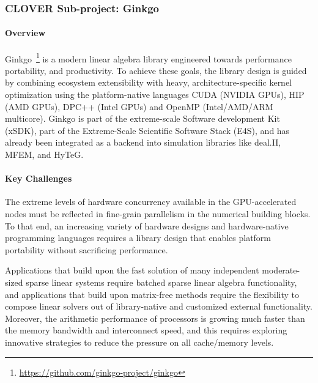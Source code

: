 \subsubsection{ CLOVER Sub-project: Ginkgo} \label{subsubsect:peeks}
\paragraph{Overview} 
Ginkgo~\footnote{\url{https://github.com/ginkgo-project/ginkgo}} is a modern
linear algebra library engineered towards performance portability, and
productivity. To achieve these goals, the library design is guided by combining
ecosystem extensibility with heavy, architecture-specific kernel optimization
using the platform-native languages CUDA (NVIDIA GPUs), HIP (AMD GPUs), DPC++
(Intel GPUs) and OpenMP (Intel/AMD/ARM multicore). Ginkgo is part of the
extreme-scale Software development Kit (xSDK), part of the Extreme-Scale
Scientific Software Stack (E4S), and has already been integrated as a backend
into simulation libraries like deal.II, MFEM, and HyTeG.



\paragraph{Key Challenges}
The extreme levels of hardware concurrency available in the
GPU-accelerated nodes must be reflected in fine-grain parallelism in
the numerical building blocks.
To that end, an increasing variety of hardware designs and hardware-native
programming languages requires a library design that enables platform
portability without sacrificing performance.

Applications that build upon the fast solution of many independent
moderate-sized sparse linear systems require batched sparse linear
algebra functionality, and
applications that build upon matrix-free methods require the flexibility
to compose linear solvers out of library-native and customized external
functionality.
Moreover, the arithmetic performance of processors is growing much faster than the
memory bandwidth and interconnect speed, and this requires exploring innovative
strategies to reduce the pressure on all cache/memory levels.

